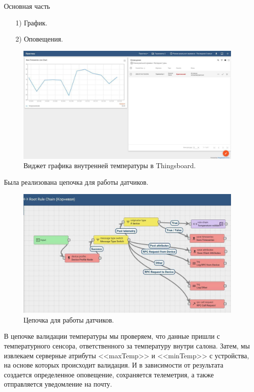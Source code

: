 \begin{chapter}{Основная часть}
	\begin{enumerate} 
      \item[1)]  График.
      \item[2)]  Оповещения.
    \end{enumerate}
    
    \begin{figure}[!ht]
		\centering
		\includegraphics[scale=0.5]{pictures/1.jpg}
		\caption{Виджет графика внутренней температуры в Thingsboard.}
		\label{fig1}
	\end{figure}

Была реализована цепочка для работы датчиков.

\newpage

    \begin{figure}[!ht]
		\centering
		\includegraphics[scale=0.6]{pictures/6.jpg}
		\caption{Цепочка для работы датчиков.}
		\label{fig1}
	\end{figure}


В цепочке валидации температуры мы проверяем, что данные пришли с температурного сенсора, ответственного за температуру внутри салона. Затем, мы извлекаем серверные атрибуты <<maxTemp>> и <<minTemp>> с устройства, на основе которых происходит валидация. И в зависимости от результата создается определенное оповещение, сохраняется телеметрия, а также отправляется уведомление на почту.


\end{chapter}
